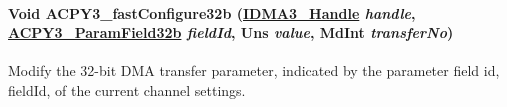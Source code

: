 \hypertarget{group___d_s_p_a_c_p_y3_g2ad7ed5dc554a991c4c11f644f5a8272}{
\paragraph[ACPY3\_\-fastConfigure32b]{\setlength{\rightskip}{0pt plus 5cm}Void ACPY3\_\-fast\-Configure32b (\hyperlink{struct_i_d_m_a3___obj}{IDMA3\_\-Handle} {\em handle}, \hyperlink{group___d_s_p_a_c_p_y3_g96f43d4bc010da2d1bb9dc08ea828de0}{ACPY3\_\-Param\-Field32b} {\em field\-Id}, Uns {\em value}, Md\-Int {\em transfer\-No})}\hfill}
\label{group___d_s_p_a_c_p_y3_g2ad7ed5dc554a991c4c11f644f5a8272}


Modify the 32-bit DMA transfer parameter, indicated by the parameter field id, field\-Id, of the current channel settings. 

